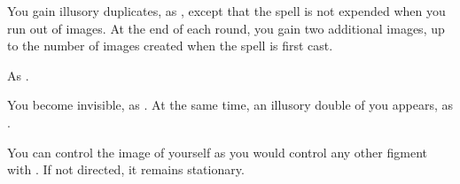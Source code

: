 \begin{spellheader}
\end{spellheader}
\begin{spellcontent}
    \begin{spelltargetinginfo}
    \end{spelltargetinginfo}
    \begin{spelleffects}
        \spelleffect You gain illusory duplicates, as , except that the spell is not expended when you run out of images. At the end of each round, you gain two additional images, up to the number of images created when the spell is first cast.
        \spelldur{\durshort \dismissable}
    \end{spelleffects}
\end{spellcontent}
\begin{spellfooter}
    \spellnotes As .
\end{spellfooter}

\begin{spellheader}
\end{spellheader}
\begin{spellcontent}
    \begin{spelltargetinginfo}
    \end{spelltargetinginfo}
    \begin{spelleffects}
        \spelleffect You become invisible, as . At the same time, an illusory double of you appears, as .

        You can control the image of yourself as you would control any other figment with . If not directed, it remains stationary.
        \spelldur{\durshort \dismissable}
    \end{spelleffects}
\end{spellcontent}
\begin{spellfooter}

\end{spellfooter}

